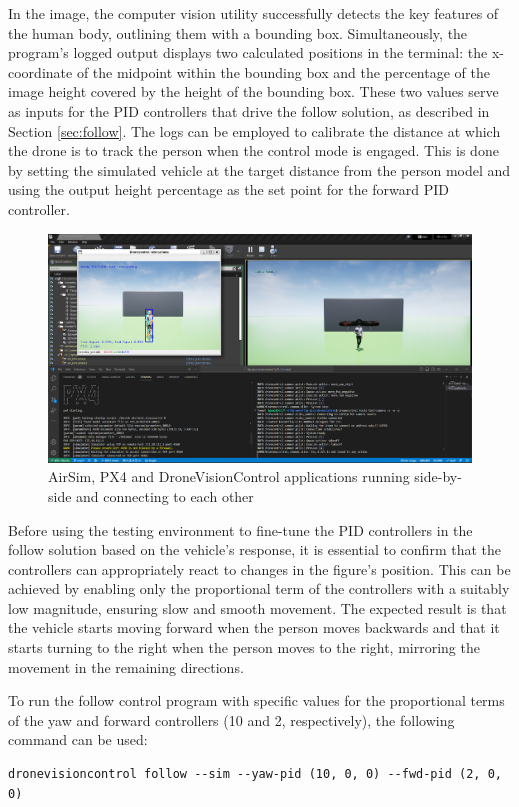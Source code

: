 In the image, the computer vision utility successfully detects the key features of the human body, outlining them with a bounding box. Simultaneously, the program's logged output displays two calculated positions in the terminal: the x-coordinate of the midpoint within the bounding box and the percentage of the image height covered by the height of the bounding box.
These two values serve as inputs for the PID controllers that drive the follow solution, as described in Section \ref{sec:follow}. The logs can be employed to calibrate the distance at which the drone is to track the person when the control mode is engaged. This is done by setting the simulated vehicle at the target distance from the person model and using the output height percentage as the set point for the forward PID controller.

\begin{figure}[H]
  \centering
  \includegraphics[width=\textwidth, keepaspectratio]{img/airsim-sitl-pose.png}
  \caption{AirSim, PX4 and DroneVisionControl applications running side-by-side and connecting to each other}
  \label{fig:airsim-sitl-pose}
\end{figure}

Before using the testing environment to fine-tune the PID controllers in the follow solution based on the vehicle's response, it is essential to confirm that the controllers can appropriately react to changes in the figure's position. This can be achieved by enabling only the proportional term of the controllers with a suitably low magnitude, ensuring slow and smooth movement. The expected result is that the vehicle starts moving forward when the person moves backwards and that it starts turning to the right when the person moves to the right, mirroring the movement in the remaining directions.

To run the follow control program with specific values for the proportional terms of the yaw and forward controllers (10 and 2, respectively), the following command can be used:

\begin{verbatim}
dronevisioncontrol follow --sim --yaw-pid (10, 0, 0) --fwd-pid (2, 0, 0)
\end{verbatim}